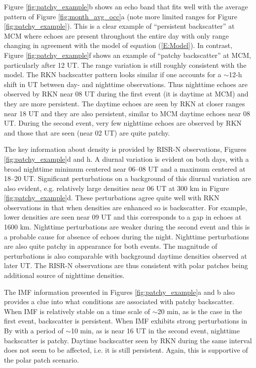 Figure \ref{fig:patchy_example}b shows an echo band that fits well with the average pattern of Figure \ref{fig:month_avg_occ}a (note more limited ranges for Figure \ref{fig:patchy_example}). This is a clear example of ``persistent backscatter'' at MCM where echoes are present throughout the entire day with only range changing in agreement with the model of equation (\ref{E:Model}). In contrast, Figure \ref{fig:patchy_example}f shows an example of ``patchy backscatter'' at MCM, particularly after 12 UT. The range variation is still roughly consistent with the model. The RKN backscatter pattern looks similar if one accounts for a \(\sim\)12-h  shift in UT between day- and nighttime observations. Thus nighttime echoes are observed by RKN near 08 UT during the first event (it is daytime at MCM) and they are more persistent. The daytime echoes are seen by RKN at closer ranges near 18 UT and they are also persistent, similar to MCM daytime echoes near 08 UT. During the second event, very few nighttime echoes are observed by RKN and those that are seen (near 02 UT) are quite patchy.

The key information about density is provided by RISR-N observations, Figures \ref{fig:patchy_example}d and h. A diurnal variation is evident on both days, with a broad nighttime minimum centered near 06--08 UT and a maximum centered at 18--20 UT. Significant perturbations on a background of this diurnal variation are also evident, e.g. relatively large densities near 06 UT at 300 km in Figure \ref{fig:patchy_example}d. These perturbations agree quite well with RKN observations in that when densities are enhanced so is backscatter. For example, lower densities are seen near 09 UT and this corresponds to a gap in echoes at 1600 km. Nighttime perturbations are weaker during the second event and this is a probable cause for absence of echoes during the night. Nighttime perturbations are also quite patchy in appearance for both events. The magnitude of perturbations is also comparable with background daytime densities observed at later UT. The RISR-N observations are thus consistent with polar patches being additional source of nighttime densities.

The IMF information presented in Figures \ref{fig:patchy_example}a and b also provides a clue into what conditions are associated with patchy backscatter. When IMF is relatively stable on a time scale of \(\sim\)20 min, as is the case in the first event, backscatter is persistent. When IMF exhibits strong perturbations in By with a period of \(\sim\)10 min, as is near 16 UT in the second event, nighttime backscatter is patchy. Daytime backscatter seen by RKN during the same interval does not seem to be affected, i.e. it is still persistent. Again, this is supportive of the polar patch scenario.

